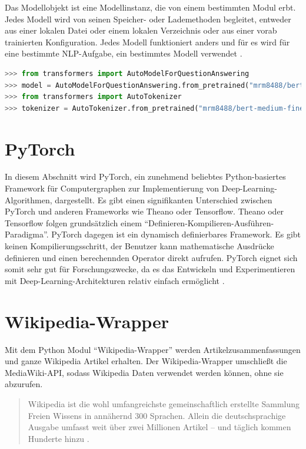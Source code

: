 \documentclass[
        ngerman,
        paper=a4,
        numbers=noendperiod,
]{scrreprt}
\begin{document}
Das Modellobjekt ist eine Modellinstanz, die von einem bestimmten Modul erbt. Jedes Modell wird von seinen Speicher- oder Lademethoden begleitet, entweder aus einer lokalen Datei oder einem lokalen Verzeichnis oder aus einer vorab trainierten Konfiguration. Jedes Modell funktioniert anders und für es wird für eine bestimmte NLP-Aufgabe, ein bestimmtes Modell verwendet \citep{TransformersDocumentation}\citep{PyTorch-TransformersPyTorch}.

\begin{lstlisting}[language=Python, caption=Transformers Beispiel]
>>> from transformers import AutoModelForQuestionAnswering
>>> model = AutoModelForQuestionAnswering.from_pretrained("mrm8488/bert-medium-finetuned-squadv2")
>>> from transformers import AutoTokenizer
>>> tokenizer = AutoTokenizer.from_pretrained("mrm8488/bert-medium-finetuned-squadv2")
\end{lstlisting}

\section{PyTorch}
In diesem Abschnitt wird PyTorch, ein zunehmend beliebtes Python-basiertes Framework für Computergraphen zur Implementierung von Deep-Learning-Algorithmen, dargestellt. Es gibt einen signifikanten Unterschied zwischen PyTorch und anderen Frameworks wie Theano oder Tensorflow. Theano oder Tensorflow folgen grundsätzlich einem \enquote{Definieren-Kompilieren-Ausführen-Paradigma}. PyTorch dagegen ist ein dynamisch definierbares Framework. Es gibt keinen Kompilierungsschritt, der Benutzer kann mathematische Ausdrücke definieren und einen berechennden Operator direkt aufrufen. PyTorch eignet sich somit sehr gut für Forschungszwecke, da es das Entwickeln und Experimentieren mit Deep-Learning-Architekturen relativ einfach ermöglicht \citep[S. 195]{Ketkar2017}.
\section{Wikipedia-Wrapper}
Mit dem Python Modul \enquote{Wikipedia-Wrapper} \citep{Goldsmith/Wikipedia:API} werden  Artikelzusammenfassungen und ganze Wikipedia Artikel erhalten. Der Wikipedia-Wrapper umschließt die MediaWiki-API, sodass Wikipedia Daten verwendet werden können, ohne sie abzurufen.

\begin{quote}
Wikipedia ist die wohl umfangreichste gemeinschaftlich erstellte
Sammlung Freien Wissens in annähernd 300 Sprachen. Allein die
deutschsprachige Ausgabe umfasst weit über zwei Millionen Artikel
– und täglich kommen Hunderte hinzu \citep{WIKIPEDIAWelt}.
\end{quote}
\end{document}
